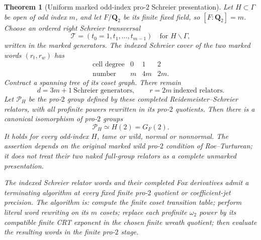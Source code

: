 \documentclass[11pt]{article}
\newtheorem{theorem}{Theorem}[section]
\theoremstyle{definition}
\begin{document}
\begin{theorem}[Uniform marked odd-index pro-$2$ Schreier presentation]
\label{thm:dyadic-f135-uniform-pro2-schreier}
Let $H\subset\Gamma$ be
open of odd index $m$,
and let $F/\mathbf Q_2$
be its finite fixed field,
so $[F:\mathbf Q_2]=m$.
Choose an ordered right
Schreier transversal
\[
\mathscr T=(t_0=1,t_1,\ldots,t_{m-1})
\quad\text{for }H\backslash\Gamma,
\]
written in the marked generators.
The indexed Schreier cover
of the \emph{two marked words}
$(r_t,r_w)$ has
\begin{equation}\label{eq:dyadic-f135-cover-cell-counts}
\boxed{
\begin{array}{c|ccc}
\text{cell degree}&0&1&2\\ \hline
\text{number}&m&4m&2m.
\end{array}}
\end{equation}
Contract a spanning tree
of its coset graph.
There remain
\begin{equation}\label{eq:dyadic-f135-cover-pro2-counts}
\boxed{\quad
d=3m+1\ \text{Schreier generators},
\qquad r=2m\ \text{indexed relators}.
\quad}
\end{equation}
Let $\mathscr P_H$ be the
pro-$2$ group defined by
these completed
Reidemeister--Schreier
relators, with
all profinite powers
rewritten in its
pro-$2$ quotients.
Then there is a
canonical isomorphism
of pro-$2$ groups
\begin{equation}\label{eq:dyadic-f135-marked-wreath-universality}
\boxed{\qquad
\mathscr P_H\simeq H(2)=G_F(2).
\qquad}
\end{equation}
It holds for
\emph{every} odd-index
$H$, tame or wild,
normal or nonnormal.
The assertion depends
on the original
\emph{marked wild}
pro-$2$ condition
of Roe--Turturean;
it does not treat
their two naked
full-group relators
as a complete
unmarked presentation.

The indexed
Schreier relator
words and their
completed Fox
derivatives admit a
terminating algorithm
at every fixed finite
pro-$2$ quotient or
coefficient-jet
precision.  The
algorithm is:
compute the finite
coset transition
table; perform
literal word rewriting
on its $m$ cosets;
replace each
profinite $\omega_2$
power by its
compatible finite
CRT exponent
in the chosen
finite wreath quotient;
then evaluate the
resulting words
in the finite
pro-$2$ stage.
\end{theorem}
\end{document}
